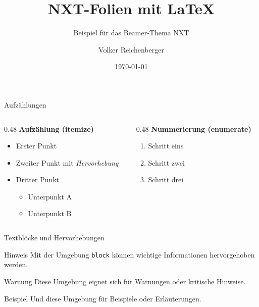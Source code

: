 \documentclass[aspectratio=169]{beamer}
\title{NXT-Folien mit \LaTeX{}}
\subtitle{Beispiel für das Beamer-Thema NXT}
\author{Volker Reichenberger}
\date{\today}
\begin{document}
\begin{frame}[plain]
  \titlepage
\end{frame}

\begin{frame}{Aufzählungen}

\begin{columns}[T]
  \begin{column}{0.48\textwidth}
    \textbf{Aufzählung (itemize)}
    \begin{itemize}
      \item Erster Punkt
      \item Zweiter Punkt mit \emph{Hervorhebung}
      \item Dritter Punkt
        \begin{itemize}
          \item Unterpunkt A
          \item Unterpunkt B
        \end{itemize}
    \end{itemize}
  \end{column}
  \begin{column}{0.48\textwidth}
    \textbf{Nummerierung (enumerate)}
    \begin{enumerate}
      \item Schritt eins
      \item Schritt zwei
      \item Schritt drei
    \end{enumerate}
  \end{column}
\end{columns}

\end{frame}

\begin{frame}{Textblöcke und Hervorhebungen}

\begin{block}{Hinweis}
  Mit der Umgebung \texttt{block} können wichtige Informationen
  hervorgehoben werden.
\end{block}

\bigskip

\begin{alertblock}{Warnung}
  Diese Umgebung eignet sich für Warnungen oder kritische Hinweise.
\end{alertblock}

\bigskip

\begin{exampleblock}{Beispiel}
  Und diese Umgebung für Beispiele oder Erläuterungen.
\end{exampleblock}

\end{frame}
\end{document}
